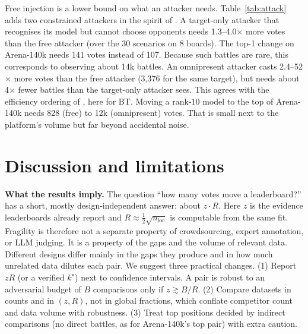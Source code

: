 \documentclass{article}
\newcommand{\kstar}{k^\star}
\begin{document}
Free injection is a lower bound on what an attacker needs. Table~\ref{tab:attack} adds two constrained attackers in the spirit of \citet{min2025improving}. A target-only attacker that recognises its model but cannot choose opponents needs 1.3--4.0$\times$ more votes than the free attacker (over the 30 scenarios on 8 boards). The top-1 change on Arena-140k needs 141 votes instead of 107. Because such battles are rare, this corresponds to observing about 14k battles. An omnipresent attacker casts 2.4--52$\times$ more votes than the free attacker (3,376 for the same target), but needs about 4$\times$ fewer battles than the target-only attacker sees. This agrees with the efficiency ordering of \citet{min2025improving}, here for BT. Moving a rank-10 model to the top of Arena-140k needs 828 (free) to 12k (omnipresent) votes. That is small next to the platform's volume but far beyond accidental noise.

\section{Discussion and limitations}\label{sec:discussion}

\textbf{What the results imply.} The question ``how many votes move a leaderboard?'' has a short, mostly design-independent answer: about $z\cdot R$. Here $z$ is the evidence leaderboards already report and $R\approx\tfrac12\sqrt{n_{\mathrm{loc}}}$ is computable from the same fit. Fragility is therefore not a separate property of crowdsourcing, expert annotation, or LLM judging. It is a property of the gaps and the volume of relevant data. Different designs differ mainly in the gaps they produce and in how much unrelated data dilutes each pair. We suggest three practical changes. (1) Report $zR$ (or a verified $\kstar$) next to confidence intervals. A pair is robust to an adversarial budget of $B$ comparisons only if $z\gtrsim B/R$. (2) Compare datasets in counts and in $(z,R)$, not in global fractions, which conflate competitor count and data volume with robustness. (3) Treat top positions decided by indirect comparisons (no direct battles, as for Arena-140k's top pair) with extra caution.
\end{document}
